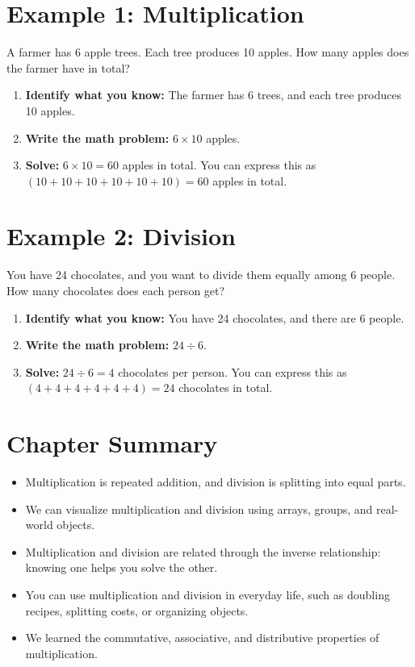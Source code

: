 \section{Example 1: Multiplication}

A farmer has 6 apple trees. Each tree produces 10 apples. How many apples does the farmer have in total?

\begin{enumerate}
    \item \textbf{Identify what you know:} The farmer has 6 trees, and each tree produces 10 apples.
    \item \textbf{Write the math problem:} $6 \times 10$ apples.
    \item \textbf{Solve:} $6 \times 10 = 60$ apples in total. You can express this as $(10 + 10 + 10 + 10 + 10 + 10) = 60$ apples in total.
\end{enumerate}

\section{Example 2: Division}

You have 24 chocolates, and you want to divide them equally among 6 people. How many chocolates does each person get?

\begin{enumerate}
    \item \textbf{Identify what you know:} You have 24 chocolates, and there are 6 people.
    \item \textbf{Write the math problem:} $24 \div 6$.
    \item \textbf{Solve:} $24 \div 6 = 4$ chocolates per person. You can express this as $(4 + 4 + 4 + 4 + 4 + 4) = 24$ chocolates in total.
\end{enumerate}

\section{Chapter Summary}
\begin{itemize}
    \item Multiplication is repeated addition, and division is splitting into equal parts.
    \item We can visualize multiplication and division using arrays, groups, and real-world objects.
    \item Multiplication and division are related through the inverse relationship: knowing one helps you solve the other.
    \item You can use multiplication and division in everyday life, such as doubling recipes, splitting costs, or organizing objects.
    \item We learned the commutative, associative, and distributive properties of multiplication.
\end{itemize}

